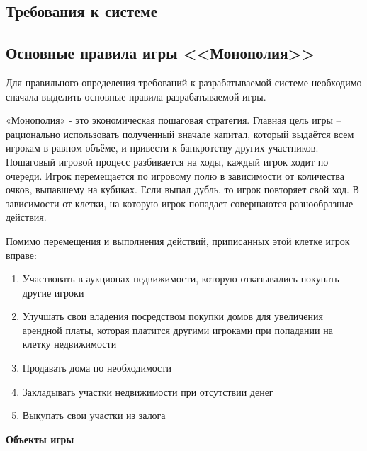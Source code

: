 \setlength{\parskip}{0cm}
\begin{Large}
\newpage
\section{Требования к системе}
\subsection{Основные правила игры <<Монополия>>}
Для правильного определения требований к разрабатываемой системе необходимо сначала выделить основные правила разрабатываемой игры.

«Монополия» - это экономическая пошаговая стратегия. Главная цель игры – рационально использовать полученный вначале капитал, который выдаётся всем игрокам в равном объёме, и привести к банкротству других участников. Пошаговый игровой процесс разбивается на ходы, каждый игрок ходит по очереди. Игрок перемещается по игровому полю в зависимости от количества очков, выпавшему на кубиках. Если выпал дубль, то игрок повторяет свой ход. В зависимости от клетки, на которую игрок попадает совершаются разнообразные действия.

Помимо перемещения и выполнения действий, приписанных этой клетке игрок вправе:
\begin{spacing}{0.9}
\begin{enumerate}
    \item Участвовать в аукционах недвижимости, которую отказывались покупать другие игроки 
    \item Улучшать свои владения посредством покупки домов для увеличения арендной платы, которая платится другими игроками при попадании на клетку недвижимости
    \item Продавать дома по необходимости
    \item Закладывать участки недвижимости при отсутствии денег
    \item Выкупать свои участки из залога
\end{enumerate}
\end{spacing}

\textbf{Объекты игры}


\end{Large}
